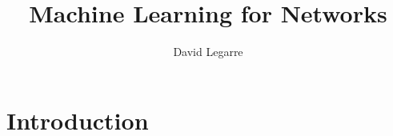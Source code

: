\documentclass[12pt, a4paper]{report}
\title{Machine Learning for Networks}
\author{David Legarre}
\begin{document}
   \maketitle
   \section{Introduction} 
   
\end{document}
